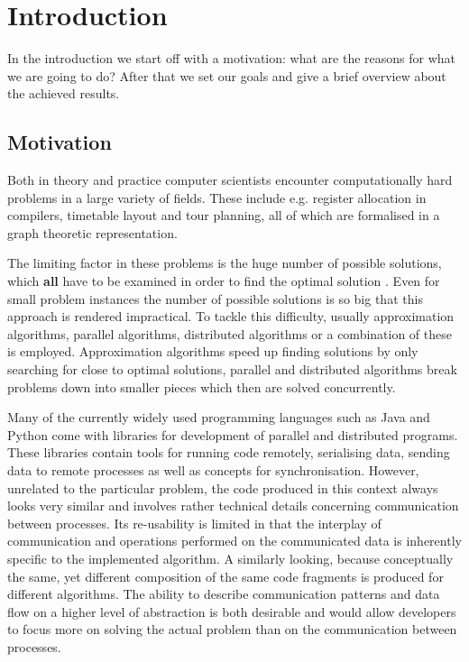 \chapter{Introduction}
In the introduction we start off with a motivation: what are the reasons for what we are going to do? After that we set our goals and give a brief overview about the achieved results.

\section{Motivation}
Both in theory and practice computer scientists encounter computationally hard problems in a large variety of fields. These include e.g. register allocation in compilers, timetable layout and tour planning, all of which are formalised in a graph theoretic \cite{Garey:1979:CIG:578533} representation.

The limiting factor in these problems is the huge number of possible solutions, which \textbf{all} have to be examined in order to find the optimal solution \cite{Garey:1979:CIG:578533}. Even for small problem instances the number of possible solutions is so big that this approach is rendered impractical. To tackle this difficulty, usually approximation algorithms, parallel algorithms, distributed algorithms or a combination of these is employed. Approximation algorithms speed up finding solutions by only searching for close to optimal solutions, parallel and distributed algorithms break problems down into smaller pieces which then are solved concurrently.

Many of the currently widely used programming languages such as Java and Python come with libraries for development of parallel and distributed programs. These libraries contain tools for running code remotely, serialising data, sending data to remote processes as well as concepts for synchronisation. However, unrelated to the particular problem, the code produced in this context always looks very similar and involves rather technical details concerning communication between processes. Its re-usability is limited in that the interplay of communication and operations performed on the communicated data is inherently specific to the implemented algorithm. A similarly looking, because conceptually the same, yet different composition of the same code fragments is produced for different algorithms. The ability to describe communication patterns and data flow on a higher level of abstraction is both desirable and would allow developers to focus more on solving the actual problem than on the communication between processes.

